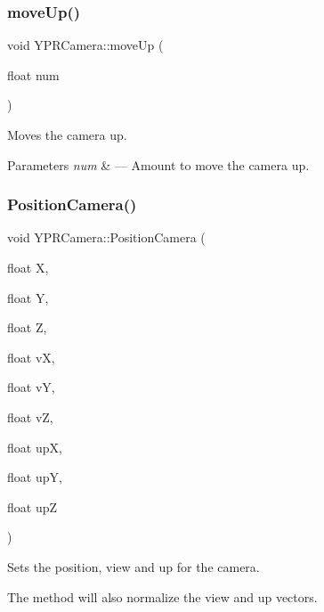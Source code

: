 \subsubsection{\texorpdfstring{move\+Up()}{moveUp()}}
{\footnotesize\ttfamily void Y\+P\+R\+Camera\+::move\+Up (\begin{DoxyParamCaption}\item[{float}]{num }\end{DoxyParamCaption})}



Moves the camera up. 


\begin{DoxyParams}{Parameters}
{\em num} & --- Amount to move the camera up. \\
\hline
\end{DoxyParams}
\mbox{\label{class_y_p_r_camera_a82b133d21e8ea170a7877553ad243621}} 
\subsubsection{\texorpdfstring{Position\+Camera()}{PositionCamera()}\hspace{0.1cm}{\footnotesize\ttfamily [1/2]}}
{\footnotesize\ttfamily void Y\+P\+R\+Camera\+::\+Position\+Camera (\begin{DoxyParamCaption}\item[{float}]{X,  }\item[{float}]{Y,  }\item[{float}]{Z,  }\item[{float}]{vX,  }\item[{float}]{vY,  }\item[{float}]{vZ,  }\item[{float}]{upX,  }\item[{float}]{upY,  }\item[{float}]{upZ }\end{DoxyParamCaption})}



Sets the position, view and up for the camera. 

The method will also normalize the view and up vectors.


